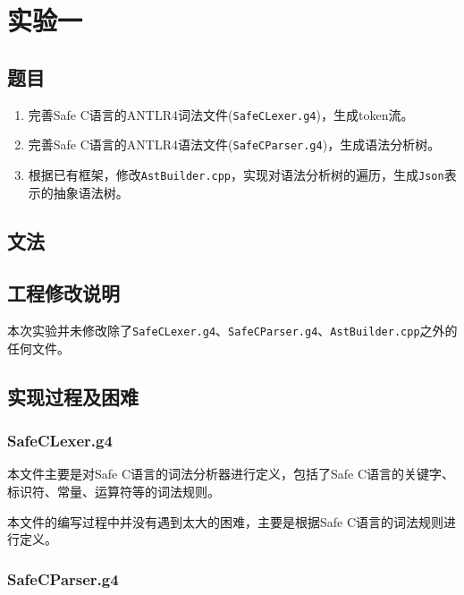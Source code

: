 \documentclass[../main.tex]{subfiles}
\begin{document}
\section{实验一}

\subsection{题目}

\kaishu

\begin{enumerate}
	\item 完善Safe C语言的ANTLR4词法文件(\texttt{SafeCLexer.g4})，生成token流。
	\item 完善Safe C语言的ANTLR4语法文件(\texttt{SafeCParser.g4})，生成语法分析树。
	\item 根据已有框架，修改\texttt{AstBuilder.cpp}，实现对语法分析树的遍历，生成\texttt{Json}表示的抽象语法树。
\end{enumerate}

\subsection{文法}

%

\songti
\subsection{工程修改说明}

本次实验并未修改除了\texttt{SafeCLexer.g4}、\texttt{SafeCParser.g4}、\texttt{AstBuilder.cpp}之外的任何文件。

\subsection{实现过程及困难}

\subsubsection{SafeCLexer.g4}

本文件主要是对Safe C语言的词法分析器进行定义，包括了Safe C语言的关键字、标识符、常量、运算符等的词法规则。

本文件的编写过程中并没有遇到太大的困难，主要是根据Safe C语言的词法规则进行定义。

\subsubsection{SafeCParser.g4}
\end{document}
